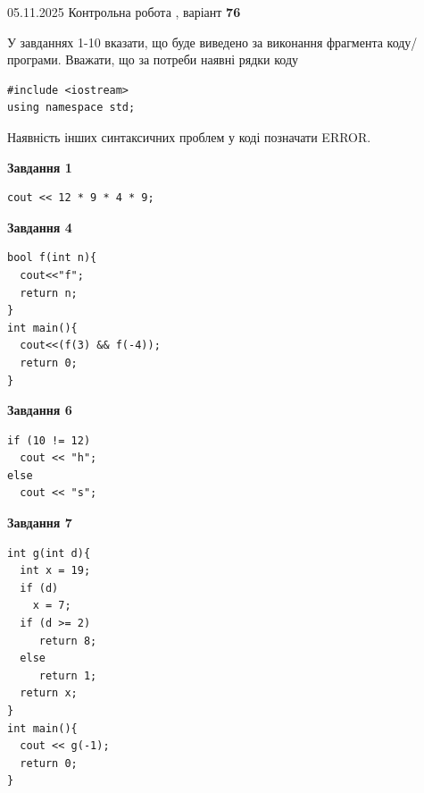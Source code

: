 \documentclass[12pt, ukrainian]{article}
\begin{document}
\newpage

{\Large{05.11.2025 Контрольна робота , варіант  \No \textbf { 76 }\par}}
{
\begin {large}
У завданнях 1-10 вказати, що буде виведено за виконання фрагмента коду/про\-гра\-ми.
Вважати, що за потреби наявні рядки коду
\begin{verbatim}
#include <iostream>
using namespace std;
\end{verbatim}
Наявність інших синтаксичних проблем у коді позначати ERROR.

\begin{minipage}[t]{7.0cm}

\begin{center}
\textbf{Завдання 1}
\end{center}
\vspace{-8mm}

\begin{verbatim}
cout << 12 * 9 * 4 * 9;
\end{verbatim}



\begin{center}
\textbf{Завдання 4}
\end{center}
\vspace{-8mm}

\begin{verbatim}
bool f(int n){
  cout<<"f";
  return n;
}
int main(){
  cout<<(f(3) && f(-4));
  return 0;
}
\end{verbatim}



\begin{center}
\textbf{Завдання 6}
\end{center}
\vspace{-8mm}

\begin{verbatim}
if (10 != 12)
  cout << "h";
else
  cout << "s";
\end{verbatim}



\begin{center}
\textbf{Завдання 7}
\end{center}
\vspace{-8mm}

\begin{verbatim}
int g(int d){
  int x = 19;
  if (d)
    x = 7;
  if (d >= 2)
     return 8;
  else
     return 1;
  return x;
}
int main(){
  cout << g(-1);
  return 0;
}
\end{verbatim}


\end{minipage}
\end{large}}
\end{document}

